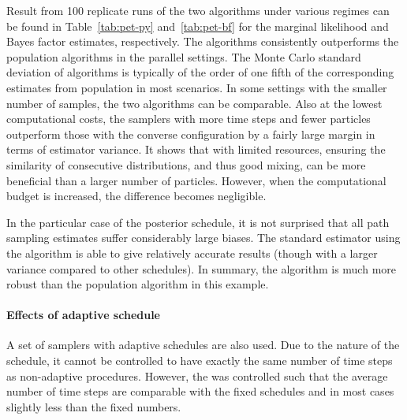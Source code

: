 Result from 100 replicate runs of the two algorithms under various regimes can
be found in Table~\ref{tab:pet-py} and~\ref{tab:pet-bf} for the marginal
likelihood and Bayes factor estimates, respectively. The \smc algorithms
consistently outperforms the population \mcmc algorithms in the parallel
settings. The Monte Carlo standard deviation of \smc algorithms is typically
of the order of one fifth of the corresponding estimates from population \mcmc
in most scenarios. In some settings with the smaller number of samples, the
two algorithms can be comparable. Also at the lowest computational costs, the
samplers with more time steps and fewer particles outperform those with the
converse configuration by a fairly large margin in terms of estimator
variance. It shows that with limited resources, ensuring the similarity of
consecutive distributions, and thus good mixing, can be more beneficial than a
larger number of particles. However, when the computational budget is
increased, the difference becomes negligible.

In the particular case of the posterior schedule, it is not surprised that all
path sampling estimates suffer considerably large biases. The standard
estimator using the \smc[2] algorithm is able to give relatively accurate
results (though with a larger variance compared to other schedules). In
summary, the \smc algorithm is much more robust than the population \mcmc
algorithm in this example.

\afterpage{\clearpage}
\afterpage{\clearpage}

\paragraph{Effects of adaptive schedule}

A set of samplers with adaptive schedules are also used. Due to the nature of
the schedule, it cannot be controlled to have exactly the same number of time
steps as non-adaptive procedures. However, the \cess was controlled such that
the average number of time steps are comparable with the fixed schedules and
in most cases slightly less than the fixed numbers.

